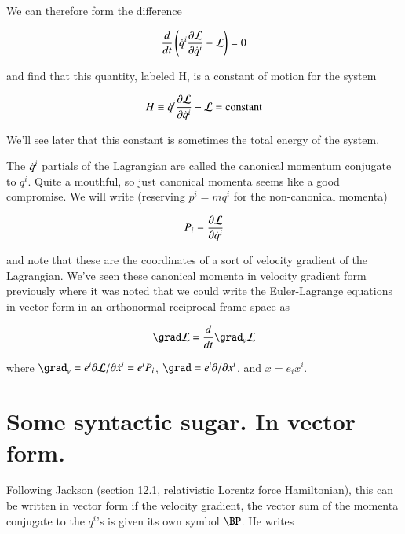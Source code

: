 We can therefore form the difference 

\begin{align}\label{eqn:hamiltonian:foo1}
\frac{d}{dt} \left( \dot{q}^i \frac{\partial {\mathcal{L}}}{\partial {\dot{q}^i}} -\mathcal{L} \right) = 0
\end{align}

and find that this quantity, labeled H, is a constant of motion for the system

\begin{align}\label{eqn:hamiltonian:foo2}
H \equiv \dot{q}^i \frac{\partial {\mathcal{L}}}{\partial {\dot{q}^i}} -\mathcal{L} = \text{constant}
\end{align}

We'll see later that this constant is sometimes the total energy of the system.

The $\dot{q}^i$ partials of the Lagrangian are called the canonical momentum conjugate to $q^i$.  Quite a mouthful, so just canonical momenta seems like a good compromise.  We will write (reserving $p^i = m q^i$ for the non-canonical momenta)

\begin{align}\label{eqn:hamiltonian:foo2b}
P_i \equiv \frac{\partial {\mathcal{L}}}{\partial {\dot{q}^i}}
\end{align}

and note that these are the coordinates of a sort of velocity gradient of the Lagrangian.  We've seen these canonical momenta in velocity gradient form previously where it was noted that we could write the Euler-Lagrange equations in vector form in an orthonormal reciprocal frame space as

\begin{align}\label{eqn:hamiltonian:foo9}
\grad \LL = \frac{d}{dt} \grad_v \LL
\end{align}

where $\grad_v = e^i \partial \LL/\partial \xdot^i = e^i P_i$, $\grad = e^i \partial/\partial x^i$, and $x = e_i x^i$.


\section{Some syntactic sugar.  In vector form.}

Following Jackson \cite{jackson1975cew} (section 12.1, relativistic Lorentz force Hamiltonian), this can be written in vector form if the velocity gradient, the vector sum of the momenta conjugate to the $q^i$'s is given its own symbol $\BP$.  He writes

